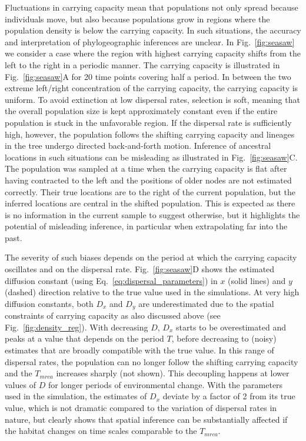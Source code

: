 \documentclass[aps,rmp, twocolumn]{revtex4}
\begin{document}
Fluctuations in carrying capacity mean that populations not only spread because individuals move, but also because populations grow in regions where the population density is below the carrying capacity.
In such situations, the accuracy and interpretation of phylogeographic inferences are unclear.
In Fig.~\ref{fig:seasaw} we consider a case where the region with highest carrying capacity shifts from the left to the right in a periodic manner.
The carrying capacity is illustrated in Fig.~\ref{fig:seasaw}A for 20 time points covering half a period.
In between the two extreme left/right concentration of the carrying capacity, the carrying capacity is uniform.
To avoid extinction at low dispersal rates, selection is soft, meaning that the overall population size is kept approximately constant even if the entire population is stuck in the unfavorable region.
If the dispersal rate is sufficiently high, however, the population follows the shifting carrying capacity and lineages in the tree undergo directed back-and-forth motion.
Inference of ancestral locations in such situations can be misleading as illustrated in Fig.~\ref{fig:seasaw}C.
The population was sampled at a time when the carrying capacity is flat after having contracted to the left and the positions of older nodes are not estimated correctly.
Their true locations are to the right of the current population, but the inferred locations are central in the shifted population.
This is expected as there is no information in the current sample to suggest otherwise, but it highlights the potential of misleading inference, in particular when extrapolating far into the past.

The severity of such biases depends on the period at which the carrying capacity oscillates and on the dispersal rate.
Fig.~\ref{fig:seasaw}D shows the estimated diffusion constant (using Eq.~\ref{eq:dispersal_parameters}) in $x$ (solid lines) and $y$ (dashed) direction relative to the true value used in the simulations.
At very high diffusion constants, both $D_x$ and $D_y$ are underestimated due to the spatial constraints of carrying capacity as also discussed above (see Fig.~\ref{fig:density_reg}).
With decreasing $D$, $D_x$ starts to be overestimated and peaks at a value that depends on the period $T$, before decreasing to (noisy) estimates that are broadly compatible with the true value.
In this range of dispersal rates, the population can no longer follow the shifting carrying capacity and the $T_{mrca}$ increases sharply (not shown).
This decoupling happens at lower values of $D$ for longer periods of environmental change.
With the parameters used in the simulation, the estimates of $D_x$ deviate by a factor of 2 from its true value, which is not dramatic compared to the variation of dispersal rates in nature, but clearly shows that spatial inference can be substantially affected if the habitat changes on time scales comparable to the $T_{mrca}$.
\end{document}
